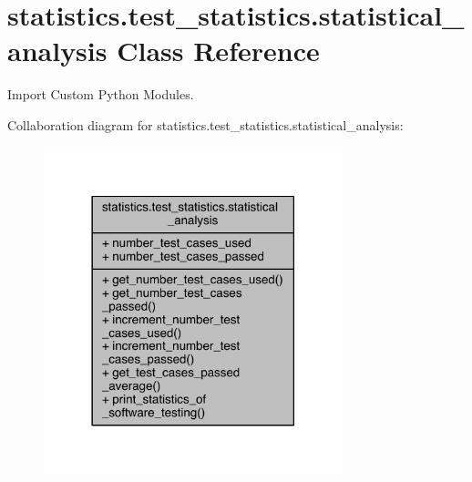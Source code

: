 \hypertarget{classstatistics_1_1test__statistics_1_1statistical__analysis}{}\section{statistics.\+test\+\_\+statistics.\+statistical\+\_\+analysis Class Reference}
\label{classstatistics_1_1test__statistics_1_1statistical__analysis}


Import Custom Python Modules.  




Collaboration diagram for statistics.\+test\+\_\+statistics.\+statistical\+\_\+analysis\+:\nopagebreak
\begin{figure}[H]
\begin{center}
\leavevmode
\includegraphics[width=246pt]{dd/d6c/classstatistics_1_1test__statistics_1_1statistical__analysis__coll__graph}
\end{center}
\end{figure}
